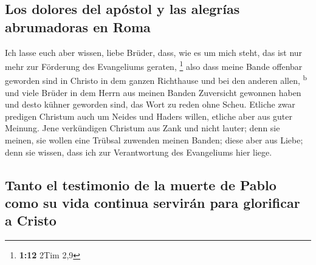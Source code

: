 \hypertarget{los-dolores-del-apuxf3stol-y-las-alegruxedas-abrumadoras-en-roma}{%
\subsection{Los dolores del apóstol y las alegrías abrumadoras en
Roma}\label{los-dolores-del-apuxf3stol-y-las-alegruxedas-abrumadoras-en-roma}}

 Ich lasse euch aber wissen, liebe Brüder, dass, wie es
um mich steht, das ist nur mehr zur Förderung des Evangeliums geraten,
\footnote{\textbf{1:12} 2Tim 2,9}  also dass meine Bande
offenbar geworden sind in Christo in dem ganzen Richthause und bei den
anderen allen, \textsuperscript{b}  und viele Brüder in
dem Herrn aus meinen Banden Zuversicht gewonnen haben und desto kühner
geworden sind, das Wort zu reden ohne Scheu.  Etliche
zwar predigen Christum auch um Neides und Haders willen, etliche aber
aus guter Meinung.  Jene verkündigen Christum aus Zank
und nicht lauter; denn sie meinen, sie wollen eine Trübsal zuwenden
meinen Banden;  diese aber aus Liebe; denn sie wissen,
dass ich zur Verantwortung des Evangeliums hier liege.

\hypertarget{tanto-el-testimonio-de-la-muerte-de-pablo-como-su-vida-continua-serviruxe1n-para-glorificar-a-cristo}{%
\subsection{Tanto el testimonio de la muerte de Pablo como su vida
continua servirán para glorificar a
Cristo}\label{tanto-el-testimonio-de-la-muerte-de-pablo-como-su-vida-continua-serviruxe1n-para-glorificar-a-cristo}}


